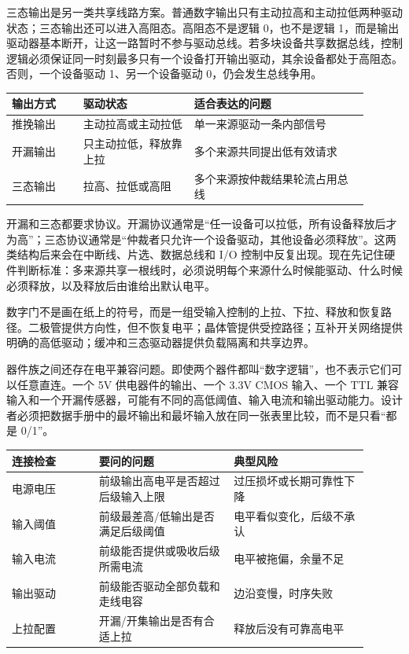 三态输出是另一类共享线路方案。普通数字输出只有主动拉高和主动拉低两种驱动状态；三态输出还可以进入高阻态。高阻态不是逻辑 0，也不是逻辑 1，而是输出驱动器基本断开，让这一路暂时不参与驱动总线。若多块设备共享数据总线，控制逻辑必须保证同一时刻最多只有一个设备打开输出驱动，其余设备都处于高阻态。否则，一个设备驱动 1、另一个设备驱动 0，仍会发生总线争用。

\begin{longtable}{L{0.18\linewidth}L{0.28\linewidth}L{0.44\linewidth}}
\toprule
输出方式 & 驱动状态 & 适合表达的问题 \\
\midrule
推挽输出 & 主动拉高或主动拉低 & 单一来源驱动一条内部信号 \\\tablerowrule
开漏输出 & 只主动拉低，释放靠上拉 & 多个来源共同提出低有效请求 \\\tablerowrule
三态输出 & 拉高、拉低或高阻 & 多个来源按仲裁结果轮流占用总线 \\
\bottomrule
\end{longtable}

开漏和三态都要求协议。开漏协议通常是“任一设备可以拉低，所有设备释放后才为高”；三态协议通常是“仲裁者只允许一个设备驱动，其他设备必须释放”。这两类结构后来会在中断线、片选、数据总线和 I/O 控制中反复出现。现在先记住硬件判断标准：多来源共享一根线时，必须说明每个来源什么时候能驱动、什么时候必须释放，以及释放后由谁给出默认电平。

数字门不是画在纸上的符号，而是一组受输入控制的上拉、下拉、释放和恢复路径。二极管提供方向性，但不恢复电平；晶体管提供受控路径；互补开关网络提供明确的高低驱动；缓冲和三态驱动器提供负载隔离和共享边界。

器件族之间还存在电平兼容问题。即使两个器件都叫“数字逻辑”，也不表示它们可以任意直连。一个 5V 供电器件的输出、一个 3.3V CMOS 输入、一个 TTL 兼容输入和一个开漏传感器，可能有不同的高低阈值、输入电流和输出驱动能力。设计者必须把数据手册中的最坏输出和最坏输入放在同一张表里比较，而不是只看“都是 0/1”。

\begin{longtable}{L{0.22\linewidth}L{0.34\linewidth}L{0.34\linewidth}}
\toprule
连接检查 & 要问的问题 & 典型风险 \\
\midrule
电源电压 & 前级输出高电平是否超过后级输入上限 & 过压损坏或长期可靠性下降 \\\tablerowrule
输入阈值 & 前级最差高/低输出是否满足后级阈值 & 电平看似变化，后级不承认 \\\tablerowrule
输入电流 & 前级能否提供或吸收后级所需电流 & 电平被拖偏，余量不足 \\\tablerowrule
输出驱动 & 前级能否驱动全部负载和走线电容 & 边沿变慢，时序失败 \\\tablerowrule
上拉配置 & 开漏/开集输出是否有合适上拉 & 释放后没有可靠高电平 \\
\bottomrule
\end{longtable}

